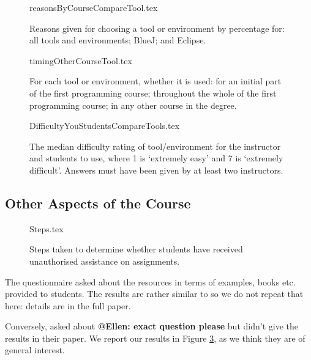 \documentclass{sig-alternate}
\begin{document}
\begin{figure}
\begin{center}
{reasonsByCourseCompareTool.tex}
\end{center}
\caption{Reasons given for choosing a tool or environment by percentage for: all tools and environments; BlueJ; and Eclipse.}
\end{figure}

\begin{figure}
\begin{center}
{timingOtherCourseTool.tex}
\end{center}\vskip-18pt
\caption{For each tool or environment, whether it is used: for an initial part of the first programming course; throughout the whole of the first programming course; in any other course in the degree.\label{fig:toolreuse}}
\end{figure}


\begin{figure}
\begin{center}
{DifficultyYouStudentsCompareTools.tex}
\end{center}
\caption{The median difficulty rating of tool/environment for the instructor and students to use, where 1 is `extremely easy' and 7 is `extremely difficult'.  Answers must have been given by at least two instructors.\label{fig:toolhard}}
\end{figure}

\subsection{Other Aspects of the Course}

\begin{figure}
\begin{center}
{Steps.tex}
\end{center}\vskip-18pt
\caption{Steps taken to determine whether students have received unauthorised assistance on assignments.\label{fig:Plagiarise}}
\end{figure}
\par
The questionnaire asked about the resources in terms of examples, books etc. provided to students. The results are rather similar to \cite[Figure 14]{mason+cooper:2014} so we do not repeat that here: details are in the full paper.
\par
Conversely, \cite{mason+cooper:2014} asked about {\bf @Ellen: exact question please} but didn't give the results  in their paper. We report our results in Figure \ref{fig:Plagiarise}, as we think they are of general interest. 
\end{document}
